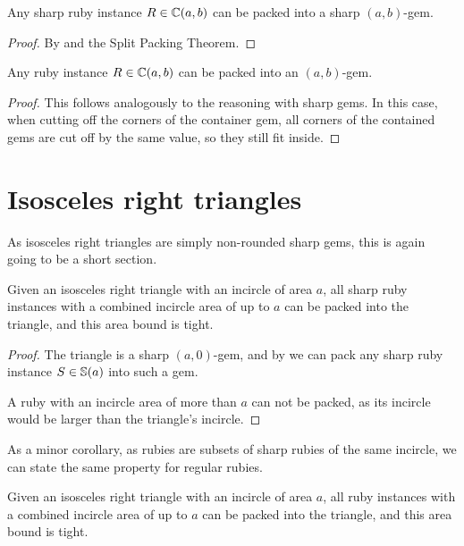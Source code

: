 \documentclass[a4paper,style=print,oneside,bibliography=totoc,nexus,lnum,extramargin]{tubsbook}
\begin{document}

\begin{theorem}\label{th:sharp-gem}
    Any sharp ruby instance $R \in \mathbb{C}(a,b)$ can be packed into a sharp $(a,b)$-gem.
\end{theorem}

\begin{proof}
    By  and the Split Packing Theorem.
\end{proof}

\begin{theorem}\label{th:gem}
    Any ruby instance $R \in \mathbb{C}(a,b)$ can be packed into an $(a,b)$-gem.
\end{theorem}

\begin{proof}
    This follows analogously to the reasoning with sharp gems. In this case, when cutting off the corners of the container gem, all corners of the contained gems are cut off by the same value, so they still fit inside.
\end{proof}

\section{Isosceles right triangles}

As isosceles right triangles are simply non-rounded sharp gems, this is again going to be a short section.

\begin{theorem}\label{th:iso-right}
    Given an isosceles right triangle with an incircle of area $a$, all sharp ruby instances with a combined incircle area of up to $a$ can be packed into the triangle, and this area bound is tight.
\end{theorem}

\begin{proof}
    The triangle is a sharp $(a,0)$-gem, and by  we can pack any sharp ruby instance $S \in \mathbb{S}(a)$ into such a gem.

    A ruby with an incircle area of more than $a$ can not be packed, as its incircle would be larger than the triangle's incircle.
\end{proof}

As a minor corollary, as rubies are subsets of sharp rubies of the same incircle, we can state the same property for regular rubies.

\begin{corollary}
    Given an isosceles right triangle with an incircle of area $a$, all ruby instances with a combined incircle area of up to $a$ can be packed into the triangle, and this area bound is tight.
\end{corollary}
\end{document}
